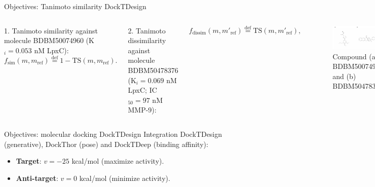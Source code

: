 \documentclass[aspectratio=169,xcolor=dvipsnames]{beamer}
\begin{document}
\begin{frame}{Objectives: Tanimoto similarity \hfill {\footnotesize \alert{DockTDesign}}}
    \begin{columns}[c]
        \alert{1. Tanimoto similarity} against molecule BDBM50074960 (K$_i=0.053$ nM LpxC):
        \begin{equation*}
            f_{{\text{sim}}}(m, m_{\text{ref}}) \stackrel{\mathrm{def}}{=} 1 - \text{TS}(m, m_{\text{ref}}).
        \end{equation*}

        \vspace{1em}

        \alert{2. Tanimoto dissimilarity} against molecule BDBM50478376 (K$_i=0.069$ nM LpxC; IC$_{50}=97$ nM MMP-9):

        \begin{equation*}
            f_{{\text{dissim}}}(m, m'_{\text{ref}}) \stackrel{\mathrm{def}}{=} \text{TS}(m, m'_{\text{ref}}),
        \end{equation*}

        \begin{figure}
            \centering
            \includegraphics[width=1.2\linewidth]{imgs/ts-compounds.pdf}
            \caption{Compound (a) BDBM50074960 and (b) BDBM50478376}
        \end{figure}
    \end{columns}
\end{frame}


\begin{frame}{Objectives: molecular docking \hfill {\footnotesize \alert{DockTDesign}}}
    Integration \alert{DockTDesign} (generative), \alert{DockThor} (pose) and \alert{DockTDeep} (binding affinity):
    \begin{itemize}
        \[
            f_{\text{docking}}(m, p, v) = (v - \hat{y}(m, p))^2,
        \]
        where $m$: molecule, $p$: protein target, $v$: target value, $\hat{y}$: affinity prediction (\alert{DockTDeep}).

        \item \textbf{Target}: $v = -25$ kcal/mol (maximize activity).
        \item \textbf{Anti-target}: $v = 0$ kcal/mol (minimize activity).
    \end{itemize}


\end{frame}
\end{document}
